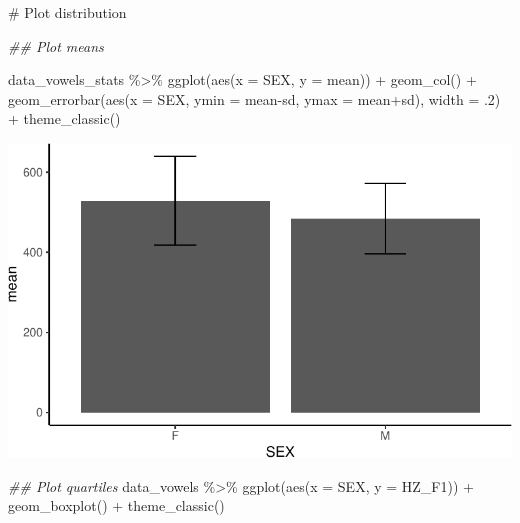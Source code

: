 \documentclass[
  11pt,
  letterpaper,
  DIV=11,
  numbers=noendperiod]{scrreprt}
\newenvironment{Shaded}{\begin{snugshade}}{\end{snugshade}}
\newcommand{\AttributeTok}[1]{\textcolor[rgb]{0.40,0.45,0.13}{#1}}
\newcommand{\CommentTok}[1]{\textcolor[rgb]{0.37,0.37,0.37}{#1}}
\newcommand{\DecValTok}[1]{\textcolor[rgb]{0.68,0.00,0.00}{#1}}
\newcommand{\DocumentationTok}[1]{\textcolor[rgb]{0.37,0.37,0.37}{\textit{#1}}}
\newcommand{\FunctionTok}[1]{\textcolor[rgb]{0.28,0.35,0.67}{#1}}
\newcommand{\NormalTok}[1]{\textcolor[rgb]{0.00,0.23,0.31}{#1}}
\newcommand{\SpecialCharTok}[1]{\textcolor[rgb]{0.37,0.37,0.37}{#1}}
\begin{document}
\begin{Shaded}
\begin{Highlighting}[]
\CommentTok{\# Plot distribution}

\DocumentationTok{\#\# Plot means}

\NormalTok{data\_vowels\_stats }\SpecialCharTok{\%\textgreater{}\%} 
  \FunctionTok{ggplot}\NormalTok{(}\FunctionTok{aes}\NormalTok{(}\AttributeTok{x =}\NormalTok{ SEX, }\AttributeTok{y =}\NormalTok{ mean)) }\SpecialCharTok{+}
    \FunctionTok{geom\_col}\NormalTok{() }\SpecialCharTok{+}
    \FunctionTok{geom\_errorbar}\NormalTok{(}\FunctionTok{aes}\NormalTok{(}\AttributeTok{x =}\NormalTok{ SEX,}
                    \AttributeTok{ymin =}\NormalTok{ mean}\SpecialCharTok{{-}}\NormalTok{sd,}
                    \AttributeTok{ymax =}\NormalTok{ mean}\SpecialCharTok{+}\NormalTok{sd), }\AttributeTok{width =}\NormalTok{ .}\DecValTok{2}\NormalTok{) }\SpecialCharTok{+}
    \FunctionTok{theme\_classic}\NormalTok{()}
\end{Highlighting}
\end{Shaded}

\includegraphics{t_test_files/figure-pdf/unnamed-chunk-7-1.pdf}

\begin{Shaded}
\begin{Highlighting}[]
\DocumentationTok{\#\# Plot quartiles}
\NormalTok{data\_vowels }\SpecialCharTok{\%\textgreater{}\%} 
  \FunctionTok{ggplot}\NormalTok{(}\FunctionTok{aes}\NormalTok{(}\AttributeTok{x =}\NormalTok{ SEX, }\AttributeTok{y =}\NormalTok{ HZ\_F1)) }\SpecialCharTok{+}
    \FunctionTok{geom\_boxplot}\NormalTok{() }\SpecialCharTok{+}
    \FunctionTok{theme\_classic}\NormalTok{()}
\end{Highlighting}
\end{Shaded}
\end{document}
